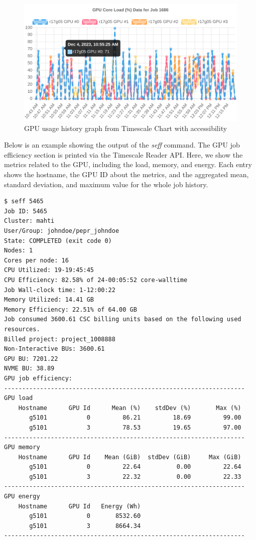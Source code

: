 \begin{figure}[H]
    \centering
    \includegraphics[width=1\textwidth]{figures/usage-accessibility-graph.png}
    \caption{GPU usage history graph from Timescale Chart with accessibility}
    \label{fig_gpu-usage-graph-accessibility}
\end{figure}

Below is an example showing the output of the \textit{seff} command. The GPU job efficiency section is printed via the Timescale Reader API. Here, we show the metrics related to the GPU, including the load, memory, and energy. Each entry shows the hostname, the GPU ID about the metrics, and the aggregated mean, standard deviation, and maximum value for the whole job history.

\clearpage

\begin{lstlisting}
$ seff 5465
Job ID: 5465
Cluster: mahti
User/Group: johndoe/pepr_johndoe
State: COMPLETED (exit code 0)
Nodes: 1
Cores per node: 16
CPU Utilized: 19-19:45:45
CPU Efficiency: 82.58% of 24-00:05:52 core-walltime
Job Wall-clock time: 1-12:00:22
Memory Utilized: 14.41 GB
Memory Efficiency: 22.51% of 64.00 GB
Job consumed 3600.61 CSC billing units based on the following used resources.
Billed project: project_1008888
Non-Interactive BUs: 3600.61
GPU BU: 7201.22
NVME BU: 38.89
GPU job efficiency:
-------------------------------------------------------------------
GPU load
    Hostname      GPU Id      Mean (%)    stdDev (%)       Max (%)
       g5101           0         86.21         18.69         99.00
       g5101           3         78.53         19.65         97.00
-------------------------------------------------------------------
GPU memory
    Hostname      GPU Id    Mean (GiB)  stdDev (GiB)     Max (GiB)
       g5101           0         22.64          0.00         22.64
       g5101           3         22.32          0.00         22.33
-------------------------------------------------------------------
GPU energy
    Hostname      GPU Id   Energy (Wh)
       g5101           0       8532.60
       g5101           3       8664.34
-------------------------------------------------------------------
\end{lstlisting}

